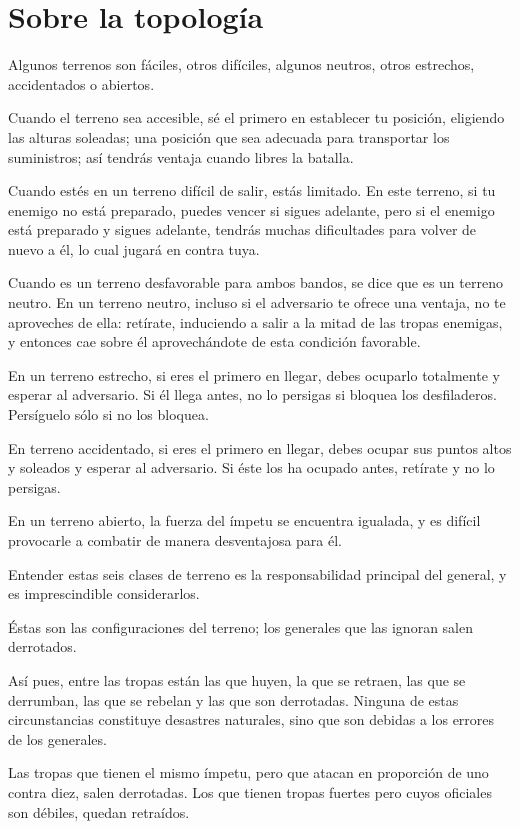 \chapter{Sobre la topología}

Algunos terrenos son fáciles, otros difíciles, algunos neutros, otros estrechos, accidentados o abiertos.

Cuando el terreno sea accesible, sé el primero en establecer tu posición, eligiendo las alturas soleadas; una posición que sea adecuada para transportar los suministros; así tendrás ventaja cuando libres la batalla.

Cuando estés en un terreno difícil de salir, estás limitado. En este terreno, si tu enemigo no está preparado, puedes vencer si sigues adelante, pero si el enemigo está preparado y sigues adelante, tendrás muchas dificultades para volver de nuevo a él, lo cual jugará en contra tuya.

Cuando es un terreno desfavorable para ambos bandos, se dice que es un terreno neutro. En un terreno neutro, incluso si el adversario te ofrece una ventaja, no te aproveches de ella: retírate, induciendo a salir a la mitad de las tropas enemigas, y entonces cae sobre él aprovechándote de esta condición favorable.

En un terreno estrecho, si eres el primero en llegar, debes ocuparlo totalmente y esperar al adversario. Si él llega antes, no lo persigas si bloquea los desfiladeros. Persíguelo sólo si no los bloquea.

En terreno accidentado, si eres el primero en llegar, debes ocupar sus puntos altos y soleados y esperar al adversario. Si éste los ha ocupado antes, retírate y no lo persigas.

En un terreno abierto, la fuerza del ímpetu se encuentra igualada, y es difícil provocarle a combatir de manera desventajosa para él.

Entender estas seis clases de terreno es la responsabilidad principal del general, y es imprescindible considerarlos.

Éstas son las configuraciones del terreno; los generales que las ignoran salen derrotados.

Así pues, entre las tropas están las que huyen, la que se retraen, las que se derrumban, las que se rebelan y las que son derrotadas. Ninguna de estas circunstancias constituye desastres naturales, sino que son debidas a los errores de los generales.

Las tropas que tienen el mismo ímpetu, pero que atacan en proporción de uno contra diez, salen derrotadas. Los que tienen tropas fuertes pero cuyos oficiales son débiles, quedan retraídos.

